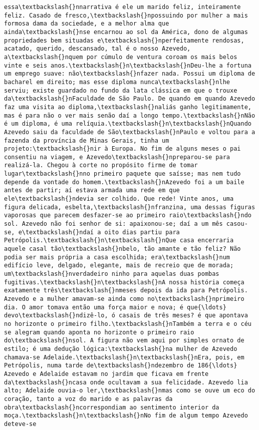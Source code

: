 \documentclass[11pt]{article}
\begin{document}
\begin{Verbatim}[commandchars=\\\{\}]
essa\textbackslash{}nnarrativa é ele um marido feliz, inteiramente feliz. Casado de fresco,\textbackslash{}npossuindo por mulher a mais formosa dama da sociedade, e a melhor alma que ainda\textbackslash{}nse encarnou ao sol da América, dono de algumas propriedades bem situadas e\textbackslash{}nperfeitamente rendosas, acatado, querido, descansado, tal é o nosso Azevedo, a\textbackslash{}nquem por cúmulo de ventura coroam os mais belos vinte e seis anos.\textbackslash{}n\textbackslash{}nDeu-lhe a fortuna um emprego suave: não\textbackslash{}nfazer nada. Possui um diploma de bacharel em direito; mas esse diploma nunca\textbackslash{}nlhe serviu; existe guardado no fundo da lata clássica em que o trouxe da\textbackslash{}nFaculdade de São Paulo. De quando em quando Azevedo faz uma visita ao diploma,\textbackslash{}naliás ganho legitimamente, mas é para não o ver mais senão daí a longo tempo.\textbackslash{}nNão é um diploma, é uma relíquia.\textbackslash{}n\textbackslash{}nQuando Azevedo saiu da faculdade de São\textbackslash{}nPaulo e voltou para a fazenda da província de Minas Gerais, tinha um projeto:\textbackslash{}nir à Europa. No fim de alguns meses o pai consentiu na viagem, e Azevedo\textbackslash{}npreparou-se para realizá-la. Chegou à corte no propósito firme de tomar lugar\textbackslash{}nno primeiro paquete que saísse; mas nem tudo depende da vontade do homem.\textbackslash{}nAzevedo foi a um baile antes de partir; aí estava armada uma rede em que ele\textbackslash{}ndevia ser colhido. Que rede! Vinte anos, uma figura delicada, esbelta,\textbackslash{}nfranzina, uma dessas figuras vaporosas que parecem desfazer-se ao primeiro raio\textbackslash{}ndo sol. Azevedo não foi senhor de si: apaixonou-se; daí a um mês casou-se, e\textbackslash{}ndaí a oito dias partiu para Petrópolis.\textbackslash{}n\textbackslash{}nQue casa encerraria aquele casal tão\textbackslash{}nbelo, tão amante e tão feliz? Não podia ser mais própria a casa escolhida; era\textbackslash{}num edifício leve, delgado, elegante, mais de recreio que de morada; um\textbackslash{}nverdadeiro ninho para aquelas duas pombas fugitivas.\textbackslash{}n\textbackslash{}nA nossa história começa exatamente três\textbackslash{}nmeses depois da ida para Petrópolis. Azevedo e a mulher amavam-se ainda como no\textbackslash{}nprimeiro dia. O amor tomava então uma força maior e nova; é que{\ldots} devo\textbackslash{}ndizê-lo, ó casais de três meses? é que apontava no horizonte o primeiro filho.\textbackslash{}nTambém a terra e o céu se alegram quando aponta no horizonte o primeiro raio do\textbackslash{}nsol. A figura não vem aqui por simples ornato de estilo; é uma dedução lógica:\textbackslash{}na mulher de Azevedo chamava-se Adelaide.\textbackslash{}n\textbackslash{}nEra, pois, em Petrópolis, numa tarde de\textbackslash{}ndezembro de 186{\ldots} Azevedo e Adelaide estavam no jardim que ficava em frente da\textbackslash{}ncasa onde ocultavam a sua felicidade. Azevedo lia alto; Adelaide ouvia-o ler,\textbackslash{}nmas como se ouve um eco do coração, tanto a voz do marido e as palavras da obra\textbackslash{}ncorrespondiam ao sentimento interior da moça.\textbackslash{}n\textbackslash{}nNo fim de algum tempo Azevedo deteve-se 
\end{Verbatim}
\end{document}
